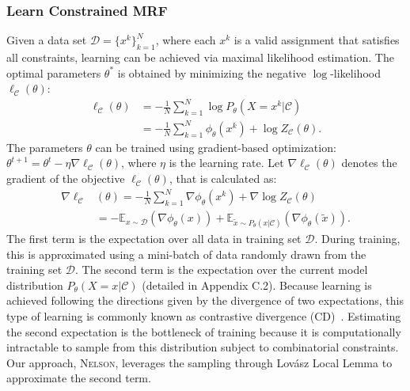 \documentclass[letterpaper]{article} %
\newcommand{\lovasz}{{Lov\'asz}\xspace}
\newcommand{\nls}{\textsc{Nelson}\xspace}
\begin{document}
\subsubsection{Learn Constrained MRF} 
Given a data set $\mathcal{D}=\{x^k\}_{k=1}^N$, where each $x^k$ is a valid assignment that satisfies all constraints, %
learning can be achieved via maximal likelihood estimation. 
The optimal parameters $\theta^*$ is obtained by minimizing the negative $\log$-likelihood $\ell_{\mathcal{C}}(\theta)$:
\begin{equation}  \label{eq:log-likelihood} 
\begin{aligned}
\ell_{\mathcal{C}}(\theta)&=-\frac{1}{N}\sum_{k=1}^N\log P_{\theta}(X=x^k|\mathcal{C})\\
&=-\frac{1}{N}\sum_{k=1}^N\phi_{\theta}(x^k)+\log Z_{\mathcal{C}}(\theta).
\end{aligned}
\end{equation}
The parameters $\theta$ can be trained using gradient-based optimization: $\theta^{t+1}= \theta^{t}-\eta\nabla\ell_{\mathcal{C}}(\theta)$, where $\eta$ is the learning rate. Let $\nabla\ell_{\mathcal{C}}(\theta)$ denotes the gradient of the objective $\ell_{\mathcal{C}}(\theta)$, that is calculated as:
\begin{equation}
\begin{aligned}\label{eq:gradient}
\nabla\ell_{\mathcal{C}}&(\theta)=-\frac{1}{N}\sum_{k=1}^N\nabla \phi_{\theta}(x^k)+ \nabla\log Z_{\mathcal{C}}(\theta)\\
&=-\mathbb{E}_{{x}\sim \mathcal{D}}\left(\nabla\phi_{\theta}({x})\right)+\mathbb{E}_{\tilde{x}\sim P_{\theta}(x|\mathcal{C})}\left(\nabla\phi_{\theta}(\tilde{x})\right).
\end{aligned}
\end{equation}
The first term is the expectation over all data in training set $\mathcal{D}$. 
%
During training, this is approximated using a mini-batch of data randomly drawn from the training set $\mathcal{D}$. 
%
The second term is the expectation over the current model distribution $P_\theta(X=x|\mathcal{C})$ (detailed in Appendix C.2). 
%
Because learning is achieved following the directions given by the divergence of two expectations, this type of learning is commonly known as contrastive divergence (CD)~\cite{DBLP:journals/neco/Hinton02}. 
%
Estimating the second expectation is the bottleneck of training because it is computationally intractable to sample from this distribution subject to combinatorial constraints. 
%
Our approach, \nls, leverages the sampling through \lovasz Local Lemma to approximate the second term. 
\end{document}
